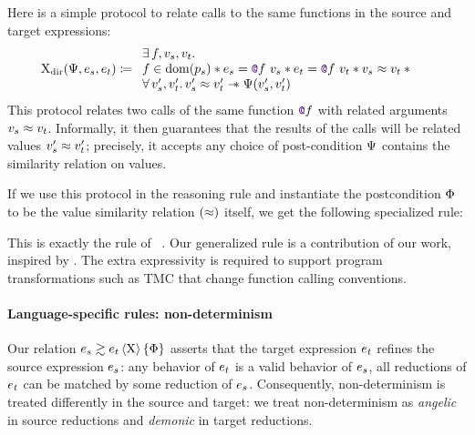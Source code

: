 Here is a simple protocol to relate calls to the same functions in the source and target expressions:
\begin{align*}
  \iProt_\mathrm{dir} (\iPredTwo, \datalangExpr_s, \datalangExpr_t)
  &\coloneqq
  \begin{array}{l}
          \exists \datalangFn, \datalangVal_s, \datalangVal_t \ldotp
      \\
          \datalangFn \in \dom{\datalangProg_s} \iSep
          \datalangExpr_s = \datalangCall{\datalangFnptr{\datalangFn}}{\datalangVal_s} \iSep
          \datalangExpr_t = \datalangCall{\datalangFnptr{\datalangFn}}{\datalangVal_t} \iSep
          \datalangVal_s \iSimilar \datalangVal_t \iSep {}
      \\
          \forall \datalangVal_s', \datalangVal_t' \ldotp
          \datalangVal_s' \iSimilar \datalangVal_t' \iSepImp
          \iPredTwo (\datalangVal_s', \datalangVal_t')
  \end{array}
\end{align*}
This protocol relates two calls of the same function $\datalangFnptr{\datalangFn}$
with related arguments $\datalangVal_s \iSimilar \datalangVal_t$. Informally, it then
guarantees that the results of the calls will be related values
$\datalangVal_s' \iSimilar \datalangVal_t'$; precisely, it accepts any choice of post-condition $\Psi$ contains the similarity relation on values.

If we use this protocol in the reasoning rule
 and instantiate the postcondition $\Phi$ to be the value similarity relation $(\approx)$ itself, we get the following specialized rule:
This is exactly the  rule of \Simuliris~\citep*{TODO-simuliris}. Our generalized rule  is a contribution of our work, inspired by \citet*{TODO-paulo}. The extra expressivity is required to support program transformations such as TMC that change function calling conventions.

\paragraph{Language-specific rules: non-determinism}
%
Our relation $\iSim[\iProt]{\iPred}{\datalangExpr_s}{\datalangExpr_t}$ asserts that the target expression $\datalangExpr_t$ refines the source expression $\datalangExpr_s$: any behavior of $\datalangExpr_t$ is a valid behavior of $\datalangExpr_s$, all reductions of $\datalangExpr_t$ can be matched by some reduction of $\datalangExpr_s$. Consequently, non-determinism is treated differently in the source and target: we treat non-determinism as \emph{angelic} in source reductions and \emph{demonic} in target reductions.

